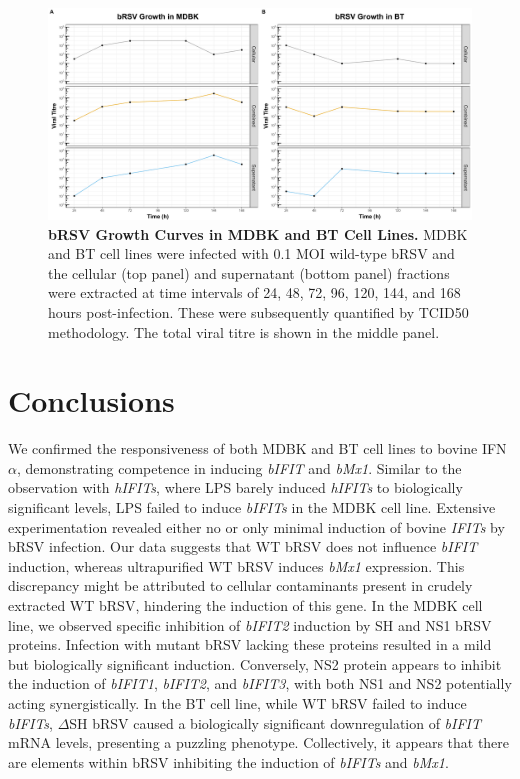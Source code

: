 \begin{figure}
    \centering
    \includegraphics[width=1\linewidth]{07. Chapter 2/Figs/01. Technologies/01. growth_curves.pdf}
    \caption[bRSV Growth Curves in MDBK and BT Cell Lines.]{\textbf{bRSV Growth Curves in MDBK and BT Cell Lines.} MDBK and BT cell lines were infected with 0.1 MOI wild-type bRSV and the cellular (top panel) and supernatant (bottom panel) fractions were extracted at time intervals of 24, 48, 72, 96, 120, 144, and 168 hours post-infection. These were subsequently quantified by TCID50 methodology. The total viral titre is shown in the middle panel.}
    \label{fig:bRSV growth curves in MDBK and BT cell lines}
\end{figure}



\section{Conclusions} \label{sec:Conclusions Chapter2}
We confirmed the responsiveness of both MDBK and BT cell lines to bovine IFN$\alpha$, demonstrating competence in inducing \textit{bIFIT} and \textit{bMx1}. Similar to the observation with \textit{hIFITs}, where LPS barely induced \textit{hIFITs} to biologically significant levels, LPS failed to induce \textit{bIFITs} in the MDBK cell line. Extensive experimentation revealed either no or only minimal induction of bovine \textit{IFITs} by bRSV infection. Our data suggests that WT bRSV does not influence \textit{bIFIT} induction, whereas ultrapurified WT bRSV induces \textit{bMx1} expression. This discrepancy might be attributed to cellular contaminants present in crudely extracted WT bRSV, hindering the induction of this gene. In the MDBK cell line, we observed specific inhibition of \textit{bIFIT2} induction by SH and NS1 bRSV proteins. Infection with mutant bRSV lacking these proteins resulted in a mild but biologically significant induction. Conversely, NS2 protein appears to inhibit the induction of \textit{bIFIT1}, \textit{bIFIT2}, and \textit{bIFIT3}, with both NS1 and NS2 potentially acting synergistically. In the BT cell line, while WT bRSV failed to induce \textit{bIFITs}, $\Delta$SH bRSV caused a biologically significant downregulation of \textit{bIFIT} mRNA levels, presenting a puzzling phenotype. Collectively, it appears that there are elements within bRSV inhibiting the induction of \textit{bIFITs} and \textit{bMx1}.


